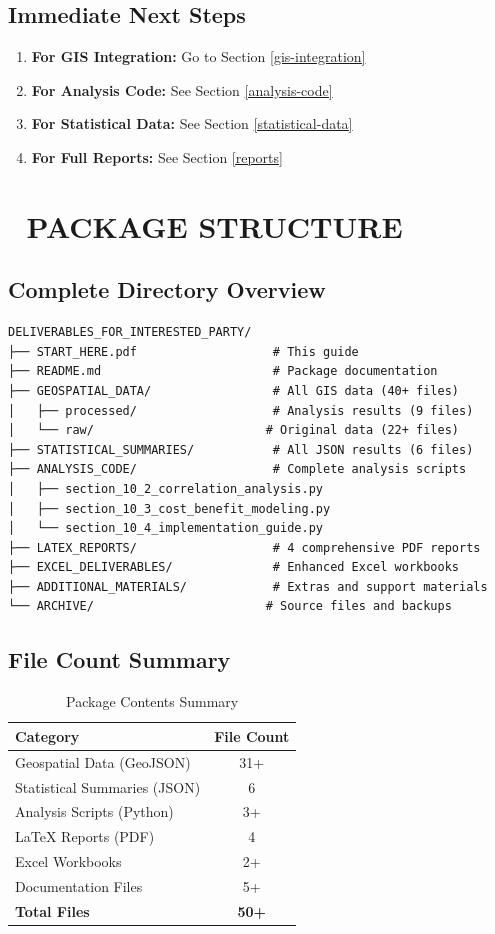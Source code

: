 \documentclass[11pt,letterpaper]{article}
\begin{document}
\subsection{Immediate Next Steps}
\begin{enumerate}
    \item \textbf{For GIS Integration:} Go to Section \ref{gis-integration}
    \item \textbf{For Analysis Code:} See Section \ref{analysis-code}
    \item \textbf{For Statistical Data:} See Section \ref{statistical-data}
    \item \textbf{For Full Reports:} See Section \ref{reports}
\end{enumerate}

\section{📁 PACKAGE STRUCTURE}

\subsection{Complete Directory Overview}
\begin{verbatim}
DELIVERABLES_FOR_INTERESTED_PARTY/
├── START_HERE.pdf                   # This guide
├── README.md                        # Package documentation
├── GEOSPATIAL_DATA/                 # All GIS data (40+ files)
│   ├── processed/                   # Analysis results (9 files)
│   └── raw/                        # Original data (22+ files)
├── STATISTICAL_SUMMARIES/           # All JSON results (6 files)
├── ANALYSIS_CODE/                   # Complete analysis scripts
│   ├── section_10_2_correlation_analysis.py
│   ├── section_10_3_cost_benefit_modeling.py
│   └── section_10_4_implementation_guide.py
├── LATEX_REPORTS/                   # 4 comprehensive PDF reports
├── EXCEL_DELIVERABLES/              # Enhanced Excel workbooks
├── ADDITIONAL_MATERIALS/            # Extras and support materials
└── ARCHIVE/                        # Source files and backups
\end{verbatim}

\subsection{File Count Summary}
\begin{table}[h]
\centering
\caption{Package Contents Summary}
\begin{tabular}{lc}
\toprule
\textbf{Category} & \textbf{File Count} \\
\midrule
Geospatial Data (GeoJSON) & 31+ \\
Statistical Summaries (JSON) & 6 \\
Analysis Scripts (Python) & 3+ \\
LaTeX Reports (PDF) & 4 \\
Excel Workbooks & 2+ \\
Documentation Files & 5+ \\
\midrule
\textbf{Total Files} & \textbf{50+} \\
\bottomrule
\end{tabular}
\end{table}
\end{document}
